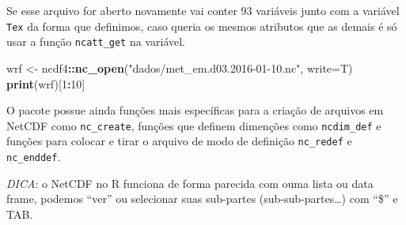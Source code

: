 \documentclass[]{book}
\newenvironment{Shaded}{\begin{snugshade}}{\end{snugshade}}
\newcommand{\KeywordTok}[1]{\textcolor[rgb]{0.13,0.29,0.53}{\textbf{#1}}}
\newcommand{\DataTypeTok}[1]{\textcolor[rgb]{0.13,0.29,0.53}{#1}}
\newcommand{\DecValTok}[1]{\textcolor[rgb]{0.00,0.00,0.81}{#1}}
\newcommand{\StringTok}[1]{\textcolor[rgb]{0.31,0.60,0.02}{#1}}
\newcommand{\OtherTok}[1]{\textcolor[rgb]{0.56,0.35,0.01}{#1}}
\newcommand{\OperatorTok}[1]{\textcolor[rgb]{0.81,0.36,0.00}{\textbf{#1}}}
\newcommand{\NormalTok}[1]{#1}
\theoremstyle{definition}
\theoremstyle{definition}
\theoremstyle{definition}
\theoremstyle{remark}
\begin{document}
\begin{Shaded}
\end{Shaded}

Se esse arquivo for aberto novamente vai conter 93 variáveis junto com a
variável \texttt{Tex} da forma que definimos, caso queria os mesmos
atributos que as demais é só usar a função \texttt{ncatt\_get} na
variável.

\begin{Shaded}
\begin{Highlighting}[]
\NormalTok{wrf     <-}\StringTok{ }\NormalTok{ncdf4}\OperatorTok{::}\KeywordTok{nc_open}\NormalTok{(}\StringTok{"dados/met_em.d03.2016-01-10.nc"}\NormalTok{, }\DataTypeTok{write=}\NormalTok{T)}
\KeywordTok{print}\NormalTok{(wrf)[}\DecValTok{1}\OperatorTok{:}\DecValTok{10}\NormalTok{]}
\end{Highlighting}
\end{Shaded}

O pacote possue ainda funções mais específicas para a criação de
arquivos em NetCDF como \texttt{nc\_create}, funções que definem
dimenções como \texttt{ncdim\_def} e funções para colocar e tirar o
arquivo de modo de definição \texttt{nc\_redef} e \texttt{nc\_enddef}.

\emph{DICA}: o NetCDF no R funciona de forma parecida com ouma lista ou
data frame, podemos ``ver'' ou selecionar suas sub-partes
(sub-sub-partes\ldots{}) com ``\$'' e TAB.
\end{document}
